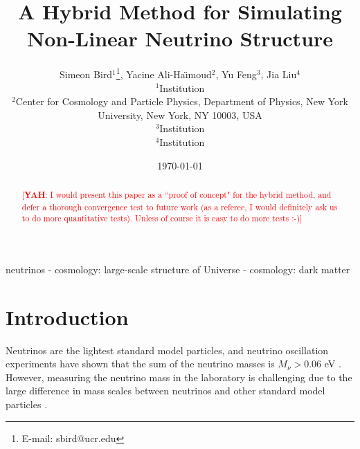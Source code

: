 \documentclass[useAMS, usenatbib]{mnras}
\newcommand{\yah}[1]{{\textcolor{red}{[{\bf YAH}: #1]}}}
\begin{document}
\title{A Hybrid Method for Simulating Non-Linear Neutrino Structure}
\author[ S. Bird et al.]{  Simeon Bird$^1$\thanks{E-mail: sbird@ucr.edu}, Yacine Ali-Ha\"{\i}moud$^2$, Yu Feng$^3$, Jia Liu$^4$\vspace{1.5mm}\\
$^1$Institution\\
$^2$Center for Cosmology and Particle Physics, Department of Physics,
New York University, New York, NY 10003, USA\\
$^3$Institution\\
$^4$Institution}


\date{\today}

\pagerange{\pageref{firstpage}--\pageref{lastpage}} 
\label{firstpage}

\maketitle

\begin{abstract}
\yah{I would present this paper as a ``proof of concept" for the hybrid method, and defer a thorough convergence test to future work (as a referee, I would definitely ask us to do more quantitative tests). Unless of course it is easy to do more tests :-)}

\end{abstract}

\begin{keywords}
        neutrinos - cosmology: large-scale structure of Universe - cosmology: dark matter
\end{keywords}

\section{Introduction}


Neutrinos are the lightest standard model particles, and neutrino oscillation experiments have shown that the sum of the neutrino masses is $M_\nu > 0.06$ eV \citep{Becker-Szendy_1992, Fukuda_1998}.
However, measuring the neutrino mass in the laboratory is challenging due to the large difference in mass scales between neutrinos and other standard model particles \cite[although see][]{Wolf_2010}.
\end{document}

